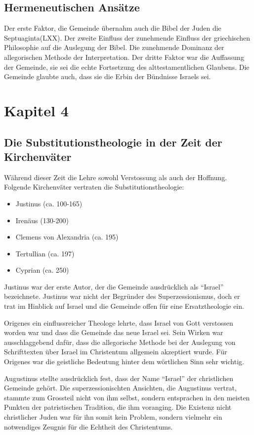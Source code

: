 \documentclass{../../inc/mybib}
\newcommand{\st}{Substitutionstheolog}
\newcommand{\sz}{Superzessionismus}
\begin{document}
    \subsection{Hermeneutischen Ansätze}
    Der erste Faktor, die Gemeinde übernahm auch die Bibel der Juden die Septuaginta(LXX). Der zweite Einfluss der zunehmende Einfluss der griechischen Philosophie auf die Auslegung der Bibel. Die zunehmende Dominanz der allegorischen Methode der Interpretation. Der dritte Faktor war die Auffassung der Gemeinde, sie sei die echte Fortsetzung des alttestamentlichen Glaubens. Die Gemeinde glaubte auch, dass sie die Erbin der Bündnisse Israels sei.
    \section{Kapitel 4}
    \subsection{Die \st ie in der Zeit der Kirchenväter}
    Während dieser Zeit die Lehre sowohl Verstossung als auch der Hoffnung.
    Folgende Kirchenväter vertraten die \st ie:
    \begin{itemize}
        \item Justinus (ca. 100-165)
        \item Irenäus (130-200)
        \item Clemens von Alexandria (ca. 195)
        \item Tertullian (ca. 197)
        \item Cyprian (ca. 250)
    \end{itemize}
    
    Justinus war der erste Autor, der die Gemeinde ausdrücklich als \enquote{Israel} bezeichnete. Justinus war nicht der Begründer des \sz, doch er trat im Hinblick auf Israel und die Gemeinde offen für eine Ersatztheologie ein.

    Origenes ein einflussreicher Theologe lehrte, dass Israel von Gott verstossen worden war und dass die Gemeinde das neue Israel sei. Sein Wirken war ausschlaggebend dafür, dass die allegorische Methode bei der Auslegung von Schrifttexten über Israel im Christentum allgemein akzeptiert wurde. Für Origenes war die geistliche Bedeutung hinter dem wörtlichen Sinn sehr wichtig.

    Augustinus stellte ausdrücklich fest, dass der Name \enquote{Israel} der christlichen Gemeinde gehört. Die superzessionischten Ansichten, die Augustinus vertrat, stammte zum Grossteil nicht von ihm selbst, sondern entsprachen in den meisten Punkten der patristischen Tradition, die ihm voranging. Die Existenz nicht christlicher Juden war für ihn somit kein Problem, sondern vielmehr ein notwendiges Zeugnis für die Echtheit des Christentums.
\end{document}
